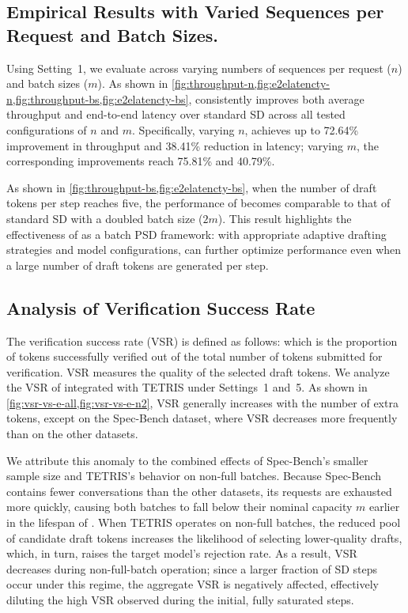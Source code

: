 \subsection{Empirical Results with Varied Sequences per Request and Batch Sizes.}
\label{app:exp-n-m}
Using Setting~1, we evaluate \alg{} across varying numbers of sequences per request ($n$) and batch sizes ($m$). As shown in \cref{fig:throughput-n,fig:e2elatencty-n,fig:throughput-bs,fig:e2elatencty-bs}, \alg{} consistently improves both average throughput and end-to-end latency over standard SD across all tested configurations of $n$ and $m$. Specifically, varying $n$, \alg{} achieves up to 72.64\% improvement in throughput and 38.41\% reduction in latency; varying $m$, the corresponding improvements reach 75.81\% and 40.79\%. 

As shown in \cref{fig:throughput-bs,fig:e2elatencty-bs}, when the number of draft tokens per step reaches five, the performance of \alg{} becomes comparable to that of standard SD with a doubled batch size ($2m$). This result highlights the effectiveness of \alg{} as a batch PSD framework: with appropriate adaptive drafting strategies and model configurations, \alg{} can further optimize performance even when a large number of draft tokens are generated per step.


\subsection{Analysis of Verification Success Rate}
\label{app:exp-vsr}

The verification success rate (VSR) is defined as follows:
which is the proportion of tokens successfully verified out of the total number of tokens submitted for verification. VSR measures the quality of the selected draft tokens. We analyze the VSR of \alg{} integrated with TETRIS under Settings~1 and~5. As shown in \cref{fig:vsr-vs-e-all,fig:vsr-vs-e-n2}, VSR generally increases with the number of extra tokens, except on the Spec-Bench dataset, where VSR decreases more frequently than on the other datasets.

We attribute this anomaly to the combined effects of Spec-Bench’s smaller sample size and TETRIS’s behavior on non-full batches. Because Spec-Bench contains fewer conversations than the other datasets, its requests are exhausted more quickly, causing both batches to fall below their nominal capacity $m$ earlier in the lifespan of \alg{}. When TETRIS operates on non-full batches, the reduced pool of candidate draft tokens increases the likelihood of selecting lower-quality drafts, which, in turn, raises the target model's rejection rate. As a result, VSR decreases during non-full-batch operation; since a larger fraction of SD steps occur under this regime, the aggregate VSR is negatively affected, effectively diluting the high VSR observed during the initial, fully saturated steps.

